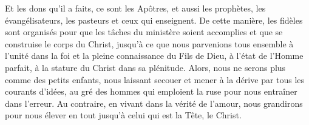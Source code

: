 Et les dons qu’il a faits, ce sont les Apôtres,
	et aussi les prophètes, les évangélisateurs, les pasteurs et ceux qui enseignent.
De cette manière, les fidèles sont organisés
		pour que les tâches du ministère soient accomplies
	et que se construise le corps du Christ,
	jusqu’à ce que nous parvenions tous ensemble à l’unité dans la foi
	et la pleine connaissance du Fils de Dieu,
	à l’état de l’Homme parfait, à la stature du Christ dans sa plénitude.
Alors, nous ne serons plus comme des petits enfants,
	nous laissant secouer et mener à la dérive par tous les courants d’idées,
	au gré des hommes qui emploient la ruse pour nous entraîner dans l’erreur.
Au contraire, en vivant dans la vérité de l’amour,
	nous grandirons pour nous élever en tout jusqu’à celui qui est la Tête, le Christ.